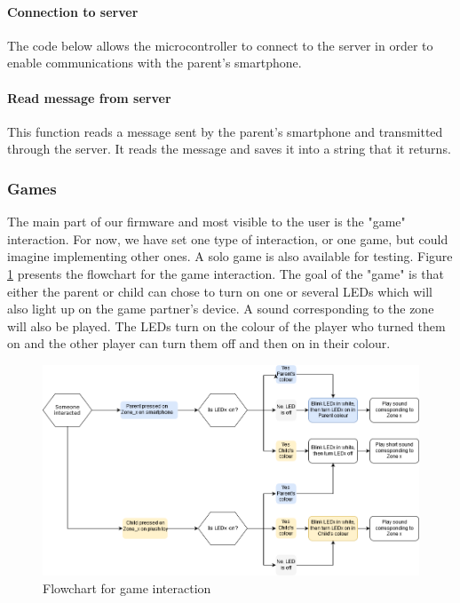 \paragraph{Connection to server}
The code below allows the microcontroller to connect to the server in order to enable communications with the parent's smartphone. 


\paragraph{Read message from server} This function reads a message sent by the parent's smartphone and transmitted through the server. It reads the message and saves it into a string that it returns. 


\subsubsection{Games}
The main part of our firmware and most visible to the user is the "game" interaction. For now, we have set one type of interaction, or one game, but could imagine implementing other ones. A solo game is also available for testing. Figure \ref{fig:game_diagram} presents the flowchart for the game interaction. The goal of the "game" is that either the parent or child can chose to turn on one or several LEDs which will also light up on the game partner's device. A sound corresponding to the zone will also be played. The LEDs turn on the colour of the player who turned them on and the other player can turn them off and then on in their colour. 

\begin{figure}[ht]
    \centering
    \includegraphics[width=\textwidth]{images/FW/FW_game_diagram.png}
    \caption{Flowchart for game interaction}
    \label{fig:game_diagram}
\end{figure}


